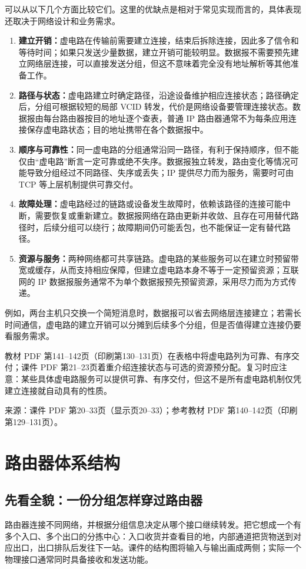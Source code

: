 可以从以下几个方面比较它们。这里的优缺点是相对于常见实现而言的，具体表现还取决于网络设计和业务需求。
\begin{enumerate}[nosep]
  \item \textbf{建立开销：}虚电路在传输前需要建立连接，结束后拆除连接，因此多了信令和等待时间；如果只发送少量数据，建立开销可能较明显。数据报不需要预先建立网络层连接，可以直接发送分组，但这不意味着完全没有地址解析等其他准备工作。
  \item \textbf{路径与状态：}虚电路建立时确定路径，沿途设备维护相应连接状态；路径确定后，分组可根据较短的局部 VCID 转发，代价是网络设备要管理连接状态。数据报由每台路由器按目的地址逐个查表，普通 IP 路由器通常不为每条应用连接保存虚电路状态；目的地址携带在各个数据报中。
  \item \textbf{顺序与可靠性：}同一虚电路的分组通常沿同一路径，有利于保持顺序，但不能仅由“虚电路”断言一定可靠或绝不失序。数据报独立转发，路由变化等情况可能导致分组经过不同路径、失序或丢失；IP 提供尽力而为服务，需要时可由 TCP 等上层机制提供可靠交付。
  \item \textbf{故障处理：}虚电路经过的链路或设备发生故障时，依赖该路径的连接可能中断，需要恢复或重新建立。数据报网络在路由更新并收敛、且存在可用替代路径时，后续分组可以绕行；故障期间仍可能丢包，也不能保证一定有替代路径。
  \item \textbf{资源与服务：}两种网络都可共享链路。虚电路的某些服务可以在建立时预留带宽或缓存，从而支持相应保障，但建立虚电路本身不等于一定预留资源；互联网的 IP 数据报服务通常不为单个数据报预先预留资源，采用尽力而为方式传递。
\end{enumerate}
例如，两台主机只交换一个简短消息时，数据报可以省去网络层连接建立；若需长时间通信，虚电路的建立开销可以分摊到后续多个分组，但是否值得建立连接仍要看服务需求。\par
\begin{remark}
教材 PDF 第141--142页（印刷第130--131页）在表格中将虚电路列为可靠、有序交付；课件 PDF 第21--23页着重介绍连接状态与可选的资源预分配。复习时应注意：某些具体虚电路服务可以提供可靠、有序交付，但这不是所有虚电路机制仅凭建立连接就自动具有的性质。
\end{remark}
\par\small\noindent 来源：课件 PDF 第20--33页（显示页20--33）；参考教材 PDF 第140--142页（印刷第129--131页）。\normalsize

\section{路由器体系结构}
\subsection{先看全貌：一份分组怎样穿过路由器}
路由器连接不同网络，并根据分组信息决定从哪个接口继续转发。把它想成一个有多个入口、多个出口的分拣中心：入口收货并查看目的地，内部通道把货物送到对应出口，出口排队后发往下一站。课件的结构图将输入与输出画成两侧；实际一个物理接口通常同时具备接收和发送功能。

